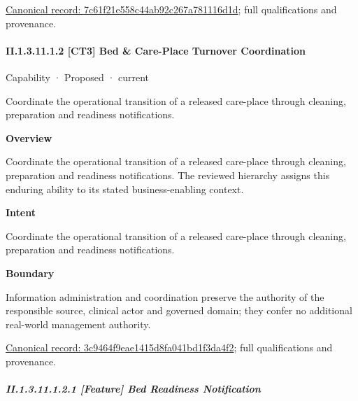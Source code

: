 {\footnotesize \href{../../../../continuum/strategy/capability/feature/7c61f21e558c44ab92c267a781116d1d.md}{Canonical record: 7c61f21e558c44ab92c267a781116d1d}; full qualifications and provenance.}\par
\paragraph*{II.1.3.11.1.2 [CT3] Bed \& Care-Place Turnover Coordination}
\label{navigation:II.1.3.11.1.2}

\label{element:3c9464f9eae1415d8fa041bd1f3da4f2}
{\small Capability · Proposed · current}\par

Coordinate the operational transition of a released care-place through cleaning, preparation and readiness notifications.



\textbf{Overview}



Coordinate the operational transition of a released care-place through cleaning, preparation and readiness notifications. The reviewed hierarchy assigns this enduring ability to its stated business-enabling context.



\textbf{Intent}



Coordinate the operational transition of a released care-place through cleaning, preparation and readiness notifications.



\textbf{Boundary}



Information administration and coordination preserve the authority of the responsible source, clinical actor and governed domain; they confer no additional real-world management authority.


{\footnotesize \href{../../../../continuum/strategy/capability/3c9464f9eae1415d8fa041bd1f3da4f2.md}{Canonical record: 3c9464f9eae1415d8fa041bd1f3da4f2}; full qualifications and provenance.}\par
\subparagraph*{II.1.3.11.1.2.1 [Feature] Bed Readiness Notification}
\label{navigation:II.1.3.11.1.2.1}

